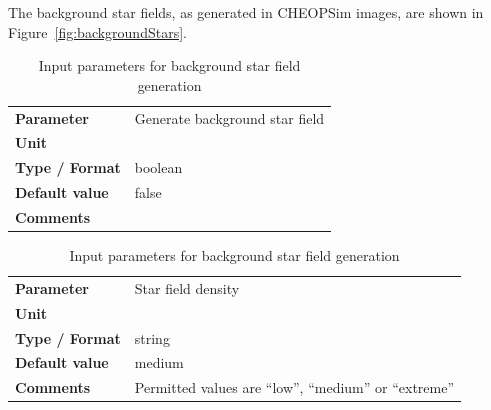 \documentclass[11pt]{article}      %
\def\HCode#1{}
\def\htmlanchor#1{\HCode{<a id="#1"></a>}}
\begin{document}
The background star fields, as generated in CHEOPSim images, are shown in Figure~\ref{fig:backgroundStars}.

\begin{table}[hb]
  \caption{Input parameters for background star field generation}

  \begin{tabular}{| l | p{13cm} |}
    \hline 
    {\bf Parameter} & Generate background star field\\
    {\bf Unit} & \\
    {\bf Type / Format} & boolean\\
    {\bf Default value} & false\\
    {\bf Comments} & \\
    \hline
  \end{tabular}
  \bigskip

  \htmlanchor{fieldCrowding}
  \begin{tabular}{| l | p{13cm} |}
    \hline 
    {\bf Parameter} & Star field density\\
    {\bf Unit} &\\
    {\bf Type / Format} & string\\
    {\bf Default value} & medium\\
    {\bf Comments} & Permitted values are ``low'', ``medium'' or ``extreme''\\
    \hline
  \end{tabular}
  \bigskip

  \label{tab:backgroundStars}
\end{table}
\end{document}
